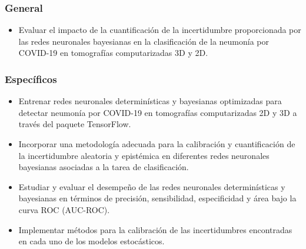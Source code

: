 \documentclass[10pt, oneside, a4paper]{article}
\begin{document}
	
	\subsubsection{General}
	\begin{itemize}
		\item Evaluar el impacto de la cuantificación de la incertidumbre proporcionada por las redes neuronales bayesianas en la clasificación de la neumonía por COVID-19 en tomografías computarizadas 3D y 2D.  
		
		
		
	\end{itemize}
	
	\subsubsection{Específicos}
	\begin{itemize}
		
		
		
		\item Entrenar redes neuronales determinísticas y bayesianas optimizadas para detectar neumonía por COVID-19 en tomografías computarizadas 2D y 3D a través del paquete TensorFlow.
		
		\item Incorporar una metodología adecuada para la calibración y cuantificación de la incertidumbre aleatoria y epistémica en diferentes redes neuronales bayesianas asociadas a la tarea de clasificación.%
		
		\item Estudiar y evaluar el desempeño de las redes neuronales determinísticas y bayesianas en términos de precisión, sensibilidad, especificidad y área bajo la curva ROC (AUC-ROC).
		
		\item Implementar métodos para la calibración de las incertidumbres encontradas en cada uno de los modelos estocásticos. 
		
	\end{itemize}
\end{document}
